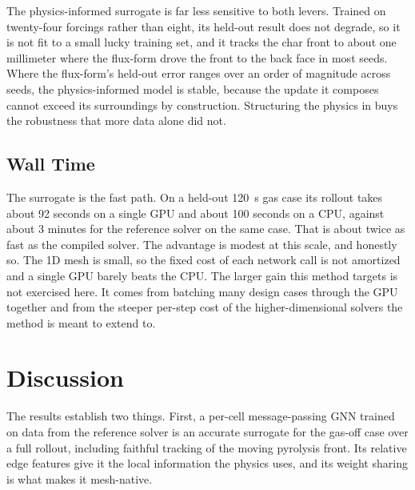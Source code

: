 \documentclass[conference]{IEEEtran}
\begin{document}
The physics-informed surrogate is far less sensitive to both levers. Trained on
twenty-four forcings rather than eight, its held-out result does not degrade, so it
is not fit to a small lucky training set, and it tracks the char front to about one
millimeter where the flux-form drove the front to the back face in most seeds. Where
the flux-form's held-out error ranges over an order of magnitude across seeds, the
physics-informed model is stable, because the update it composes cannot exceed its
surroundings by construction. Structuring the physics in buys the robustness that
more data alone did not.

\subsection{Wall Time}
The surrogate is the fast path. On a held-out 120~s gas case its rollout takes about
92 seconds on a single GPU and about 100 seconds on a CPU, against about 3 minutes
for the reference solver on the same case. That is about twice as fast as the
compiled solver. The advantage is modest at this scale, and honestly so. The 1D mesh is small, so the fixed cost of
each network call is not amortized and a single GPU barely beats the CPU. The larger
gain this method targets is not exercised here. It comes from batching many design
cases through the GPU together and from the steeper per-step cost of the
higher-dimensional solvers the method is meant to extend to.

\section{Discussion}
The results establish two things. First, a per-cell message-passing GNN trained on
data from the reference solver is an accurate surrogate for the gas-off case
over a full rollout, including faithful tracking of the moving pyrolysis front. Its
relative edge features give it the local information the physics uses, and its
weight sharing is what makes it mesh-native.
\end{document}
